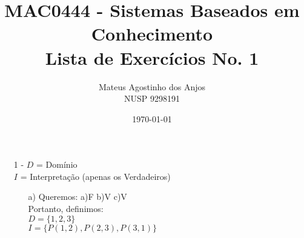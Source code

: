 \documentclass[12pt]{article}
\title{MAC0444 - Sistemas Baseados em Conhecimento \\
Lista de Exercícios No. 1
}
\author{Mateus Agostinho dos Anjos\\NUSP 9298191}
\date{\today}
\begin{document}
	\maketitle
	\begin{itemize}
		\item[1 -]
			$D$ = Domínio\\
			$I$ = Interpretação (apenas os Verdadeiros)\\
			\begin{itemize}
				\item[a)]
					Queremos: a)F b)V c)V\\
					Portanto, definimos:\\
					$D = \lbrace 1, 2, 3 \rbrace$\\
					$I = \lbrace P(1, 2), P(2, 3), P(3, 1) \rbrace$
			\end{itemize}
		
	\end{itemize}
\end{document}
